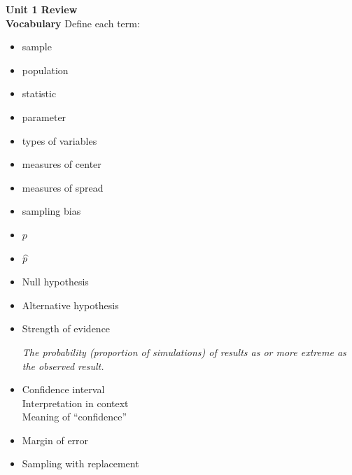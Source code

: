 
\def\theTopic{Unit 1 Review }
\def\dayNum{9}

\begin{center}
{\bf {\large Unit 1 Review }}
 \\
  {\bf Vocabulary} Define each term:
\end{center}
\begin{itemize}
\item sample
\item population
\item statistic
\item parameter
\item types of variables
\item measures of center
\item measures of spread
\item sampling bias
\item $p$
\item $\widehat{p}$
 \item Null hypothesis 
 \item Alternative hypothesis
\item Strength of evidence 
\begin{key}
{\it
    The probability (proportion of simulations) of results as or
    more extreme as the observed result.}
\end{key}
\item Confidence interval\\
     Interpretation in context\\
     Meaning of ``confidence''
\item Margin of error
\item Sampling with replacement
\end{itemize}
\begin{students}
\newpage
\end{students}


